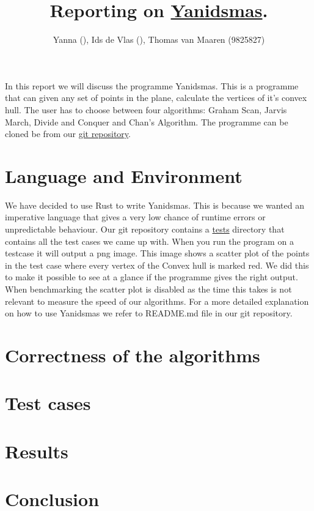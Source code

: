 \documentclass{article}
\title{Reporting on \href{https://github.com/tvmaaren/GeoAlgBonus-Yanidsmas}{Yanidsmas}.}
\author{Yanna \todo{surname} (\todo{student number}), Ids de Vlas (\todo{student number}), Thomas van Maaren (9825827)}
\begin{document}
\maketitle

In this report we will discuss the programme Yanidsmas. This is a programme that can
given any set of points in the plane, calculate the vertices of it's convex hull. The
user has to choose between four algorithms: Graham Scan, Jarvis March, Divide
and Conquer and Chan's Algorithm. The programme can be cloned be from our
\href{https://github.com/tvmaaren/GeoAlgBonus-Yanidsmas}{git repository}.

\section*{Language and Environment}

We have decided to use Rust to write Yanidsmas. This is because we wanted an imperative
language that gives a very low chance of runtime errors or unpredictable behaviour.
Our git repository contains a \href{https://github.com/tvmaaren/GeoAlgBonus-Yanidsmas/tree/main/tests}{tests} directory that contains all the test cases we came up with.
When you run the program on a testcase it will output a png image. This image shows
a scatter plot of the points in the test case where every vertex of the Convex hull is
marked red. We did this to make it possible to see at a glance if the programme gives
the right output. When benchmarking the scatter plot is disabled as the
time this takes is not relevant to measure the speed of our algorithms. For a more
detailed explanation on how to use Yanidsmas we refer to README.md file in our git repository.

\section*{Correctness of the algorithms}



\section*{Test cases}

\section*{Results}

\section*{Conclusion}
\end{document}
